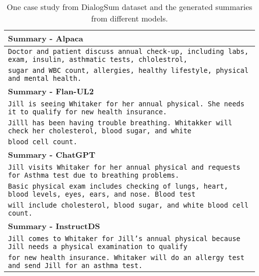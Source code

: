 \documentclass[11pt]{article}
\begin{document}
\begin{table*}[t]
\begin{adjustbox}{width=1.00\textwidth,center}
\begin{tabular}{ | l | }
        \textbf{Summary - Alpaca} \\ \hline
        \texttt{Doctor and patient discuss annual check-up, including labs, exam, insulin, asthmatic tests, chlolestrol,} \\
        \texttt{sugar and WBC count, allergies, healthy lifestyle, physical and mental health.}\\ \hline \hline
        
        \textbf{Summary - Flan-UL2} \\ \hline
        \texttt{Jill is seeing Whitaker for her annual physical. She needs it to qualify for new health insurance. } \\
        \texttt{Jilll has been having trouble breathing. Whitakker will check her cholesterol, blood sugar, and white} \\
        \texttt{blood cell count.}  \\ \hline \hline
        
        \textbf{Summary - ChatGPT} \\ \hline
        \texttt{Jill visits Whitaker for her annual physical and requests for Asthma test due to breathing problems.} \\
        \texttt{Basic physical exam includes checking of lungs, heart, blood levels, eyes, ears, and nose. Blood test } \\
        \texttt{will include cholesterol, blood sugar, and white blood cell count.} \\ \hline \hline
        
        \textbf{Summary - InstructDS} \\ \hline
        \texttt{Jill comes to Whitaker for Jill's annual physical because Jill needs a physical examination to qualify } \\
        \texttt{for new health insurance. Whitaker will do an allergy test and send Jill for an asthma test.} \\
        
        \bottomrule
        \end{tabular}
        \end{adjustbox}
        \caption{One case study from DialogSum dataset and the generated summaries from different models.}
        \label{tab:DialogSum_examples1}
    \end{table*}
\end{document}

